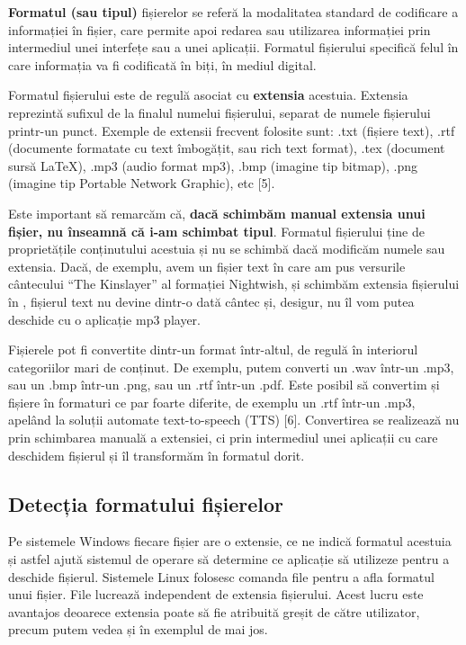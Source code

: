 \textbf{Formatul (sau tipul)} fișierelor se referă la modalitatea standard de
codificare a informației în fișier, care permite apoi redarea sau utilizarea
informației prin intermediul unei interfețe sau a unei aplicații. Formatul
fișierului specifică felul în care informația va fi codificată în biți, în
mediul digital.

Formatul fișierului este de regulă asociat cu \textbf{extensia} acestuia.
Extensia reprezintă sufixul de la finalul numelui fișierului, separat de numele
fișierului printr-un punct. Exemple de extensii frecvent folosite sunt: .txt
(fișiere text), .rtf (documente formatate cu text îmbogățit, sau rich text
format), .tex (document sursă LaTeX), .mp3 (audio format mp3), .bmp (imagine tip
bitmap), .png (imagine tip Portable Network Graphic), etc [5].

Este important să remarcăm că, \textbf{dacă schimbăm manual extensia unui
fișier, nu înseamnă că i-am schimbat tipul}. Formatul fișierului ține de
proprietățile conținutului acestuia și nu se schimbă dacă modificăm numele sau
extensia. Dacă, de exemplu, avem un fișier text în care am pus versurile
cântecului “The Kinslayer” al formației Nightwish, și schimbăm extensia
fișierului  în , fișierul text nu devine
dintr-o dată cântec și, desigur, nu îl vom putea deschide cu o aplicație mp3
player.

Fișierele pot fi convertite dintr-un format într-altul, de regulă în interiorul
categoriilor mari de conținut. De exemplu, putem converti un .wav într-un .mp3,
sau un .bmp într-un .png, sau un .rtf într-un .pdf. Este posibil să convertim și
fișiere în formaturi ce par foarte diferite, de exemplu un .rtf într-un .mp3,
apelând la soluții automate text-to-speech (TTS) [6]. Convertirea se realizează
nu prin schimbarea manuală a extensiei, ci prin intermediul unei aplicații cu
care deschidem fișierul și îl transformăm în formatul dorit.

\subsection{Detecția formatului fișierelor}
\label{sec:file-system-format-detection}

Pe sistemele Windows fiecare fișier are o extensie, ce ne indică formatul
acestuia și astfel ajută sistemul de operare să determine ce aplicație să
utilizeze pentru a deschide fișierul. Sistemele Linux folosesc comanda file
pentru a afla formatul unui fișier. File lucrează independent de extensia
fișierului. Acest lucru este avantajos deoarece extensia poate să fie atribuită
greșit de către utilizator, precum putem vedea și în exemplul de mai jos.

